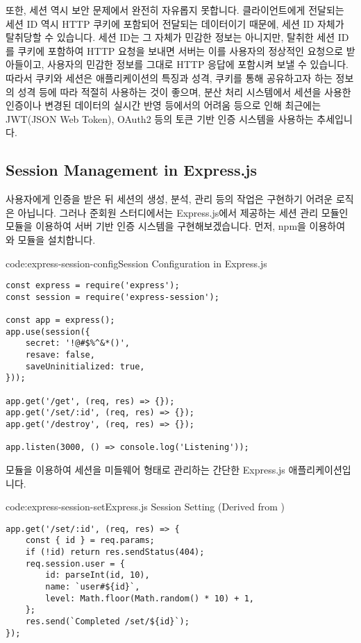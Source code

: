 또한, 세션 역시 보안 문제에서 완전히 자유롭지 못합니다. 클라이언트에게 전달되는 세션 ID 역시 HTTP 쿠키에 포함되어 전달되는 데이터이기 때문에, 세션 ID 자체가 탈취당할 수 있습니다. 세션 ID는 그 자체가 민감한 정보는 아니지만, 탈취한 세션 ID를 쿠키에 포함하여 HTTP 요청을 보내면 서버는 이를 사용자의 정상적인 요청으로 받아들이고, 사용자의 민감한 정보를 그대로 HTTP 응답에 포함시켜 보낼 수 있습니다.
따라서 쿠키와 세션은 애플리케이션의 특징과 성격, 쿠키를 통해 공유하고자 하는 정보의 성격 등에 따라 적절히 사용하는 것이 좋으며, 분산 처리 시스템에서 세션을 사용한 인증이나 변경된 데이터의 실시간 반영 등에서의 어려움 등으로 인해 최근에는 JWT(JSON Web Token), OAuth2 등의 토큰 기반 인증 시스템을 사용하는 추세입니다.

\subsection*{Session Management in Express.js}

사용자에게 인증을 받은 뒤 세션의 생성, 분석, 관리 등의 작업은 구현하기 어려운 로직은 아닙니다. 그러나 준회원 스터디에서는 Express.js에서 제공하는 세션 관리 모듈인  모듈을 이용하여 서버 기반 인증 시스템을 구현해보겠습니다. 먼저, npm을 이용하여 와  모듈을 설치합니다.

\begin{codeenv}{code:express-session-config}{Session Configuration in Express.js}\begin{verbatim}
const express = require('express');
const session = require('express-session');

const app = express();
app.use(session({
    secret: '!@#$%^&*()',
    resave: false,
    saveUninitialized: true,
}));

app.get('/get', (req, res) => {});
app.get('/set/:id', (req, res) => {});
app.get('/destroy', (req, res) => {});

app.listen(3000, () => console.log('Listening'));
\end{verbatim}
\end{codeenv}

\는  모듈을 이용하여 세션을 미들웨어 형태로 관리하는 간단한 Express.js 애플리케이션입니다.

\begin{codeenv}{code:express-session-set}{Express.js Session Setting (Derived from )}\begin{verbatim}
app.get('/set/:id', (req, res) => {
    const { id } = req.params;
    if (!id) return res.sendStatus(404);
    req.session.user = {
        id: parseInt(id, 10),
        name: `user#${id}`,
        level: Math.floor(Math.random() * 10) + 1,
    };
    res.send(`Completed /set/${id}`);
});
\end{verbatim}
\end{codeenv}

